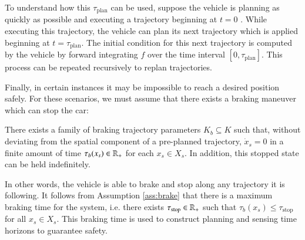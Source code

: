 \begin{rem}\label{rem:plan}
To understand how this $\tau_\text{plan}$ can be used, suppose the vehicle is planning as quickly as possible and executing a trajectory beginning at $t=0$ . 
While executing this trajectory, the vehicle can plan its next trajectory which is applied beginning at $t = \tau_{\text{plan}}$. 
The initial condition for this next trajectory is computed by the vehicle by forward integrating $f$ over the time interval $[0,\tau_{\text{plan}}]$.
This process can be repeated recursively to replan trajectories. 
\end{rem}


Finally, in certain instances it may be impossible to reach a desired position safely.
For these scenarios, we must assume that there exists a braking maneuver which can stop the car:
\begin{assum}\label{ass:brake}
There exists a family of braking trajectory parameters $K_b \subseteq K$ such that, without deviating from the spatial component of a pre-planned trajectory, $\dot{x}_s = 0$ in a finite amount of time $\tau_b(x_s) \in \mathbb{R}_+$ for each $x_s \in X_s$.
In addition, this stopped state can be held indefinitely.
\end{assum}
In other words, the vehicle is able to brake and stop along any trajectory it is following.
It follows from Assumption \ref{ass:brake} that there is a maximum braking time for the system, i.e. there exists $\tau_\text{stop} \in \mathbb{R}_+$ such that $\tau_b(x_s) \leq \tau_\text{stop}$ for all $x_s \in X_s$.
This braking time is used to construct planning and sensing time horizons to guarantee safety.


